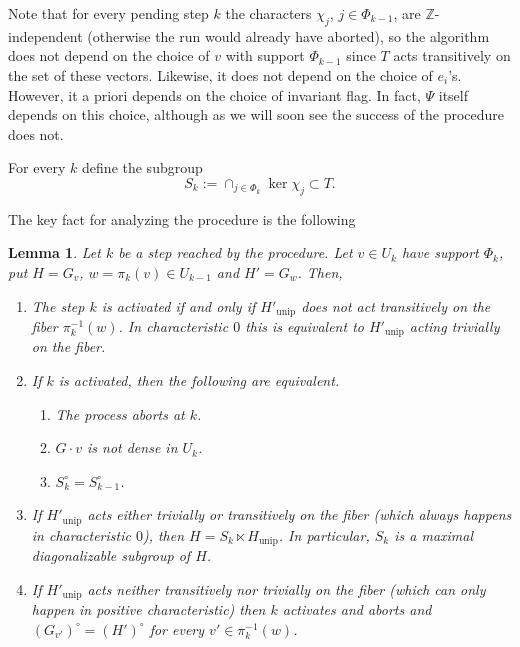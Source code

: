 \documentclass[12pt]{article}
\newtheorem{lemma}[theorem]{Lemma}
\newcommand{\Z}{\mathbb{Z}}
\newcommand{\rad}[1]{#1_{\operatorname{unip}}}
\begin{document}
Note that for every pending step $k$ the characters $\chi_j$, $j\in\Phi_{k-1}$, are $\Z$-independent (otherwise the run would already
have aborted), so the algorithm does not depend on the choice of $v$ with support $\Phi_{k-1}$
since $T$ acts transitively on the set of these vectors.
Likewise, it does not depend on the choice of $e_i$'s. However, it a priori depends on the choice of invariant flag.
In fact, $\Psi$ itself depends on this choice, although as we will soon see the success of the procedure does not.

For every $k$ define the subgroup
\[
S_k:=\cap_{j\in\Phi_k}\ker\chi_j\subset T.
\]

The key fact for analyzing the procedure is the following
\begin{lemma} \label{lem: kstep}
Let $k$ be a step reached by the procedure.
Let $v\in U_k$ have support $\Phi_k$, put $H=G_v$, $w=\pi_k(v)\in U_{k-1}$ and $H'=G_w$. Then,
\begin{enumerate}
\item The step $k$ is activated if and only if $\rad{H'}$ does not act transitively on the fiber
$\pi_k^{-1}(w)$. In characteristic $0$ this is equivalent to $\rad{H'}$ acting trivially on the fiber.
\item If $k$ is activated, then the following are equivalent.
\begin{enumerate}
\item The process aborts at $k$.
\item $G\cdot v$ is not dense in $U_k$.
\item $S_k^\circ=S_{k-1}^\circ$.
\end{enumerate}
\item If $\rad{H'}$ acts either trivially or transitively on the fiber (which always happens in characteristic $0$), then $H=S_k\ltimes \rad{H}$.
In particular, $S_k$ is a maximal diagonalizable subgroup of $H$.
\item If $\rad{H'}$ acts neither transitively nor trivially on the fiber (which can only happen in positive characteristic)
then $k$ activates and aborts and $(G_{v'})^\circ=(H')^\circ$ for every $v'\in\pi_k^{-1}(w)$.
\end{enumerate}
\end{lemma}
\end{document}
